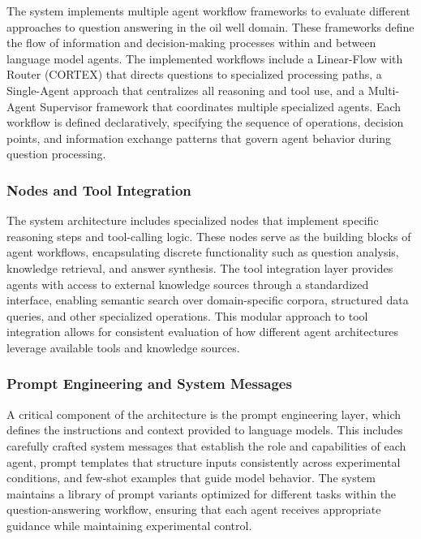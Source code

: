                 The system implements multiple agent workflow frameworks to evaluate different approaches to question answering in the oil well domain. These frameworks define the flow of information and decision-making processes within and between language model agents. The implemented workflows include a Linear-Flow with Router (CORTEX) that directs questions to specialized processing paths, a Single-Agent approach that centralizes all reasoning and tool use, and a Multi-Agent Supervisor framework that coordinates multiple specialized agents. Each workflow is defined declaratively, specifying the sequence of operations, decision points, and information exchange patterns that govern agent behavior during question processing.

            \subsubsection{Nodes and Tool Integration}

                The system architecture includes specialized nodes that implement specific reasoning steps and tool-calling logic. These nodes serve as the building blocks of agent workflows, encapsulating discrete functionality such as question analysis, knowledge retrieval, and answer synthesis. The tool integration layer provides agents with access to external knowledge sources through a standardized interface, enabling semantic search over domain-specific corpora, structured data queries, and other specialized operations. This modular approach to tool integration allows for consistent evaluation of how different agent architectures leverage available tools and knowledge sources.

            \subsubsection{Prompt Engineering and System Messages}

                A critical component of the architecture is the prompt engineering layer, which defines the instructions and context provided to language models. This includes carefully crafted system messages that establish the role and capabilities of each agent, prompt templates that structure inputs consistently across experimental conditions, and few-shot examples that guide model behavior. The system maintains a library of prompt variants optimized for different tasks within the question-answering workflow, ensuring that each agent receives appropriate guidance while maintaining experimental control.

